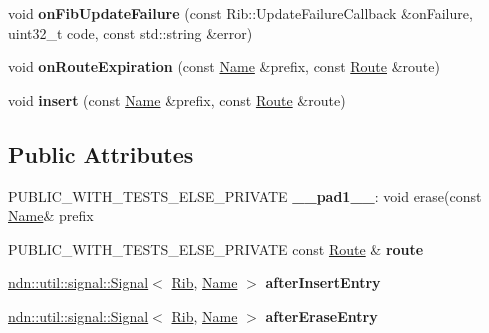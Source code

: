 \begin{DoxyCompactItemize}
\item 
void {\bfseries on\+Fib\+Update\+Failure} (const Rib\+::\+Update\+Failure\+Callback \&on\+Failure, uint32\+\_\+t code, const std\+::string \&error)\hypertarget{classnfd_1_1rib_1_1Rib_a44fc28758976a0df1e909f706e396cdc}{}\label{classnfd_1_1rib_1_1Rib_a44fc28758976a0df1e909f706e396cdc}

\item 
void {\bfseries on\+Route\+Expiration} (const \hyperlink{classndn_1_1Name}{Name} \&prefix, const \hyperlink{classnfd_1_1rib_1_1Route}{Route} \&route)\hypertarget{classnfd_1_1rib_1_1Rib_ab4993a19563130662251c05e00db0755}{}\label{classnfd_1_1rib_1_1Rib_ab4993a19563130662251c05e00db0755}

\item 
void {\bfseries insert} (const \hyperlink{classndn_1_1Name}{Name} \&prefix, const \hyperlink{classnfd_1_1rib_1_1Route}{Route} \&route)\hypertarget{classnfd_1_1rib_1_1Rib_a9f7776a706639c7f80117232db393c1e}{}\label{classnfd_1_1rib_1_1Rib_a9f7776a706639c7f80117232db393c1e}

\end{DoxyCompactItemize}
\subsection*{Public Attributes}
\begin{DoxyCompactItemize}
\item 
P\+U\+B\+L\+I\+C\+\_\+\+W\+I\+T\+H\+\_\+\+T\+E\+S\+T\+S\+\_\+\+E\+L\+S\+E\+\_\+\+P\+R\+I\+V\+A\+TE {\bfseries \+\_\+\+\_\+pad1\+\_\+\+\_\+}\+: void erase(const \hyperlink{classndn_1_1Name}{Name}\& prefix\hypertarget{classnfd_1_1rib_1_1Rib_aee3a6fa864f2264e2e647da99e2751b5}{}\label{classnfd_1_1rib_1_1Rib_aee3a6fa864f2264e2e647da99e2751b5}

\item 
P\+U\+B\+L\+I\+C\+\_\+\+W\+I\+T\+H\+\_\+\+T\+E\+S\+T\+S\+\_\+\+E\+L\+S\+E\+\_\+\+P\+R\+I\+V\+A\+TE const \hyperlink{classnfd_1_1rib_1_1Route}{Route} \& {\bfseries route}\hypertarget{classnfd_1_1rib_1_1Rib_a1b809d20cbfa39b3f9e686d2be55c0bc}{}\label{classnfd_1_1rib_1_1Rib_a1b809d20cbfa39b3f9e686d2be55c0bc}

\item 
\hyperlink{classndn_1_1util_1_1signal_1_1Signal}{ndn\+::util\+::signal\+::\+Signal}$<$ \hyperlink{classnfd_1_1rib_1_1Rib}{Rib}, \hyperlink{classndn_1_1Name}{Name} $>$ {\bfseries after\+Insert\+Entry}\hypertarget{classnfd_1_1rib_1_1Rib_a6a3e0fb7349da66036e86c2dcac80fe3}{}\label{classnfd_1_1rib_1_1Rib_a6a3e0fb7349da66036e86c2dcac80fe3}

\item 
\hyperlink{classndn_1_1util_1_1signal_1_1Signal}{ndn\+::util\+::signal\+::\+Signal}$<$ \hyperlink{classnfd_1_1rib_1_1Rib}{Rib}, \hyperlink{classndn_1_1Name}{Name} $>$ {\bfseries after\+Erase\+Entry}\hypertarget{classnfd_1_1rib_1_1Rib_ac4cce07959649f30257828805790b12a}{}\label{classnfd_1_1rib_1_1Rib_ac4cce07959649f30257828805790b12a}

\end{DoxyCompactItemize}
